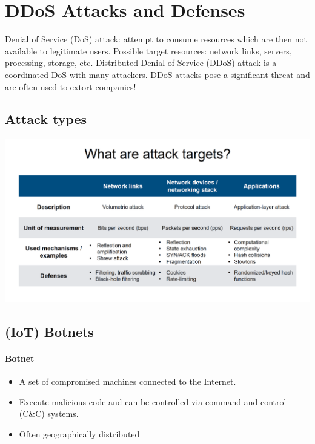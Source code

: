 \section{DDoS Attacks and Defenses}
\label{ddos}

Denial of Service (DoS) attack: attempt to consume resources which are then not available to legitimate users. Possible target resources: network links, servers, processing, storage, etc. Distributed Denial of Service (DDoS) attack is a coordinated DoS with many attackers. DDoS attacks pose a significant threat and are often used to extort companies!

\subsection{Attack types}

\begin{minipage}{\linewidth}
    \centering      
    \includegraphics[width=\linewidth]{Figures/DDOS_attack_types.PNG} 
\end{minipage}

\subsection{(IoT) Botnets}
\paragraph{Botnet} 
\begin{itemize}
    \item A set of compromised machines connected to the Internet.
    \item Execute malicious code and can be controlled via command and control (C&C) systems.
    \item Often geographically distributed
\end{itemize}

